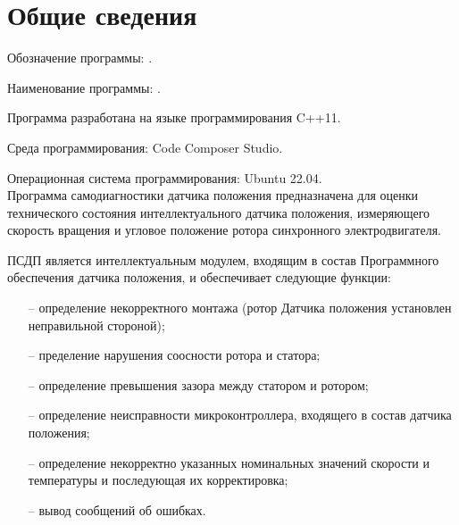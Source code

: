 \newpage
\section{Общие сведения}
Обозначение программы: \productcodefull.

Наименование программы: \programname.

Программа разработана на языке программирования C++11.

Среда программирования: Code Composer Studio.

Операционная система программирования: Ubuntu 22.04.\\


Программа самодиагностики датчика положения предназначена для оценки технического состояния интеллектуального датчика положения, измеряющего скорость вращения и угловое положение ротора синхронного электродвигателя.

ПСДП является интеллектуальным модулем, входящим в состав Программного обеспечения датчика положения, и обеспечивает следующие функции:
\begin{enumerate}
    \item[--] определение некорректного монтажа (ротор Датчика положения установлен неправильной стороной);
    \item[--] пределение нарушения соосности ротора и статора;
    \item[--] определение превышения зазора между статором и ротором;
    \item[--] определение неисправности микроконтроллера, входящего в состав датчика положения;
    \item[--] определение некорректно указанных номинальных значений скорости и температуры и последующая их корректировка;
    \item[--] вывод сообщений об ошибках.
\end{enumerate}
